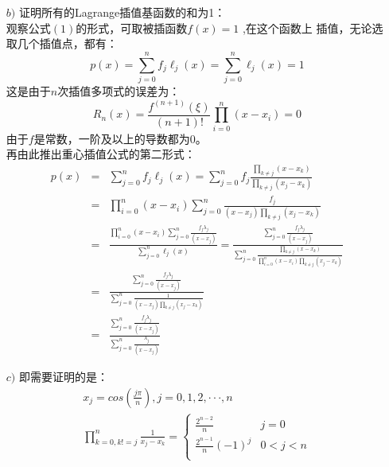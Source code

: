 \documentclass[12pt,a4paper,utf8]{ctexart}
\begin{document}
\begin{enumerate}
\begin{enumerate}
    
    \item[$b)$] 证明所有的Lagrange插值基函数的和为1：\\
        观察公式$(1)$的形式，可取被插函数$f(x)=1$ ,在这个函数上
        插值，无论选取几个插值点，都有：
        \begin{equation}
            p(x) = \sum_{j=0}^{n} f_j \ell_j(x) = \sum_{j=0}^{n}\ell_j(x)=1
        \end{equation}
        这是由于$n$次插值多项式的误差为：
        \begin{equation}
            R_{n}(x) = \frac{f^{(n+1)}(\xi)}{(n+1)!}\prod_{i=0}^{n}(x-x_{i})=0 
        \end{equation}
        由于$f$是常数，一阶及以上的导数都为$0$。\\
        再由此推出重心插值公式的第二形式：
        \begin{eqnarray} 
            p(x) &=& \sum_{j=0}^{n} f_j \ell_j(x) = \sum_{j=0}^{n} f_j \frac{\prod_{k \neq j}\left(x-x_{k}\right)}{\prod_{k \neq j}\left(x_{j}-x_{k}\right)}\nonumber \\ 
                 &=& \prod_{i=0}^{n}(x-x_{i})\sum_{j=0}^{n}\frac{f_j}{(x-x_{j})\prod_{k \neq j}\left(x_{j}-x_{k}\right)}                                    \nonumber \\ 
                 &=& \frac{\prod_{i=0}^{n}(x-x_{i})\sum_{j=0}^{n}\frac{f_{j}\lambda_{j}}{(x-x_{j})}}{\sum_{j=0}^{n}\ell_j(x)}
                  =  \frac{\sum_{j=0}^{n}\frac{f_{j}\lambda_{j}}{(x-x_{j})}}{\sum_{j=0}^{n}\frac{\prod_{k \neq j}(x-x_{k})}{\prod_{i=0}^{n}(x-x_{i})\prod_{k \neq j}(x_{j}-x_{k})}} \nonumber \\
                 &=& \frac{\sum_{j=0}^{n}\frac{f_{j}\lambda_{j}}{(x-x_{j})}}{\sum_{j=0}^{n}\frac{1}{(x-x_{j})\prod_{k \neq j}(x_{j}-x_{k})}} \nonumber \\
                 &=& \frac{\sum_{j=0}^{n}\frac{f_{j}\lambda_{j}}{(x-x_{j})}}{\sum_{j=0}^{n}\frac{\lambda_{j}}{(x-x_{j})}}
        \end{eqnarray}
    \item[$c)$] 即需要证明的是：\\
        \begin{eqnarray}
            x_{j}=cos(\frac{j\pi}{n}),j=0,1,2,···,n  \\
            \prod_{k=0,k!=j}^{n}\frac{1}{x_{j}-x_{k}}=
            \left\{\begin{array}{ll}
                \frac{2^{n-2}}{n} & j=0 \\
                \frac{2^{n-1}}{n}(-1)^{j} & 0<j<n \\

\end{array}
\end{eqnarray}
\end{enumerate}
\end{enumerate}
\end{document}
